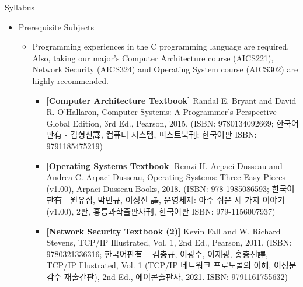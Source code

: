 \begin{frame}{Syllabus}
  \begin{itemize}
  \item Prerequisite Subjects
    \begin{itemize}
      \item Programming experiences in the C programming language are required. Also, taking our major's Computer Architecture course (AICS221), Network Security (AICS324) and Operating System course (AICS302) are highly recommended.
      \begin{itemize}
        \item \textbf{[Computer Architecture Textbook]} Randal E. Bryant and David R. O'Hallaron, Computer Systems: A Programmer's Perspective - Global Edition, 3rd Ed., Pearson, 2015. (ISBN: 9780134092669; 한국어판有 - 김형신譯, 컴퓨터 시스템, 퍼스트북刊; 한국어판 ISBN: 9791185475219)
        \item \textbf{[Operating Systems Textbook]} Remzi H. Arpaci-Dusseau and Andrea C. Arpaci-Dusseau, Operating Systems: Three Easy Pieces (v1.00), Arpaci-Dusseau Books, 2018. (ISBN: 978-1985086593; 한국어판有 - 원유집, 박민규, 이성진 譯, 운영체제: 아주 쉬운 세 가지 이야기 (v1.00), 2판, 홍릉과학출판사刊, 한국어판 ISBN: 979-1156007937)
        \item \textbf{[Network Security Textbook (2)]} Kevin Fall and W. Richard Stevens, TCP/IP Illustrated, Vol. 1, 2nd Ed., Pearson, 2011. (ISBN: 9780321336316; 한국어판有 – 김충규, 이광수, 이재광, 홍충선譯, TCP/IP Illustrated, Vol. 1 (TCP/IP 네트워크 프로토콜의 이해, 이정문 감수 재출간판), 2nd Ed., 에이콘출판사, 2021. ISBN: 9791161755632)
      \end{itemize}
    \end{itemize}
  \end{itemize}
\end{frame}

